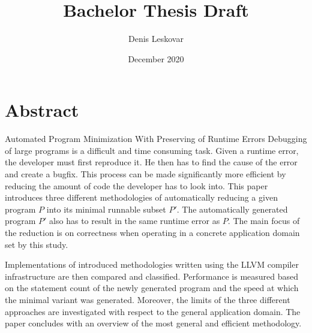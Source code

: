 \documentclass{article}
\title{Bachelor Thesis Draft}
\author{Denis Leskovar}
\date{December 2020}
\begin{document}
\maketitle

\section{Abstract}
Automated Program Minimization With Preserving of Runtime Errors
Debugging of large programs is a difficult and time consuming task. Given a runtime error, the
developer must first reproduce it. He then has to find the cause of the error and create a bugfix. This process can be made significantly more efficient by reducing the amount of code the developer has to look into. This paper introduces three different methodologies of automatically reducing a given program $P$ into its minimal runnable subset $P'$. The automatically generated program $P'$ also has to result in the same runtime error as $P$. The main focus of the reduction is on correctness when operating in a concrete application domain set by this study. \par
Implementations of introduced methodologies written using the LLVM compiler infrastructure are then compared and classified. Performance is measured based on the statement count of the newly generated program and the speed at which the minimal variant was generated. Moreover, the limits of the three different approaches are investigated with respect to the general application domain. The paper concludes with an overview of the most general and efficient methodology.
\end{document}
